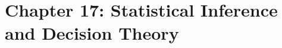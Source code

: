 \section{Chapter 17: Statistical Inference and Decision Theory}
\label{ch:statistical-inference-decision-theory}

